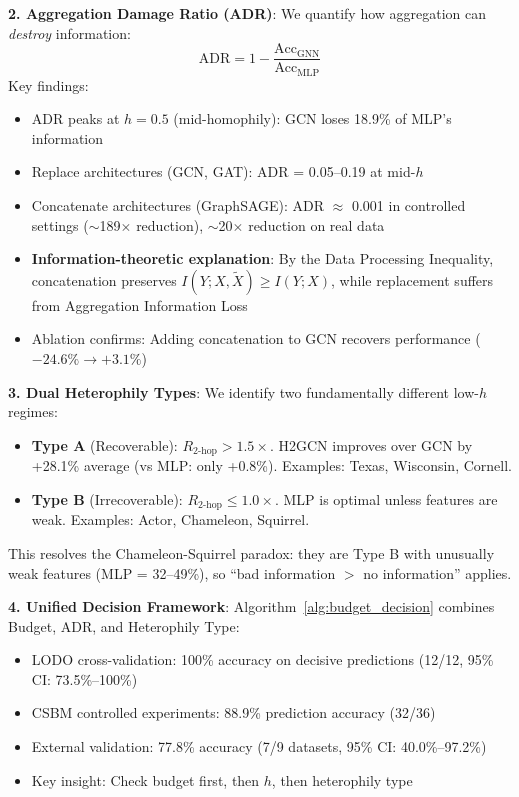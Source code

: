 \textbf{2. Aggregation Damage Ratio (ADR)}: We quantify how aggregation can \textit{destroy} information:
\begin{equation}
    \text{ADR} = 1 - \frac{\text{Acc}_{\text{GNN}}}{\text{Acc}_{\text{MLP}}}
\end{equation}
Key findings:
\begin{itemize}
    \item ADR peaks at $h = 0.5$ (mid-homophily): GCN loses 18.9\% of MLP's information
    \item Replace architectures (GCN, GAT): ADR = 0.05--0.19 at mid-$h$
    \item Concatenate architectures (GraphSAGE): ADR $\approx$ 0.001 in controlled settings ($\sim$189$\times$ reduction), $\sim$20$\times$ reduction on real data
    \item \textbf{Information-theoretic explanation}: By the Data Processing Inequality, concatenation preserves $I(Y; X, \tilde{X}) \geq I(Y; X)$, while replacement suffers from Aggregation Information Loss
    \item Ablation confirms: Adding concatenation to GCN recovers performance ($-24.6\% \to +3.1\%$)
\end{itemize}

\textbf{3. Dual Heterophily Types}: We identify two fundamentally different low-$h$ regimes:
\begin{itemize}
    \item \textbf{Type A} (Recoverable): $R_{2\text{-hop}} > 1.5\times$. H2GCN improves over GCN by +28.1\% average (vs MLP: only +0.8\%). Examples: Texas, Wisconsin, Cornell.
    \item \textbf{Type B} (Irrecoverable): $R_{2\text{-hop}} \leq 1.0\times$. MLP is optimal unless features are weak. Examples: Actor, Chameleon, Squirrel.
\end{itemize}
This resolves the Chameleon-Squirrel paradox: they are Type B with unusually weak features (MLP = 32--49\%), so ``bad information $>$ no information'' applies.

\textbf{4. Unified Decision Framework}: Algorithm~\ref{alg:budget_decision} combines Budget, ADR, and Heterophily Type:
\begin{itemize}
    \item LODO cross-validation: 100\% accuracy on decisive predictions (12/12, 95\% CI: 73.5\%--100\%)
    \item CSBM controlled experiments: 88.9\% prediction accuracy (32/36)
    \item External validation: 77.8\% accuracy (7/9 datasets, 95\% CI: 40.0\%--97.2\%)
    \item Key insight: Check budget first, then $h$, then heterophily type
\end{itemize}

